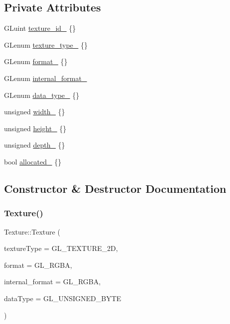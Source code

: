 \subsection*{Private Attributes}
\begin{DoxyCompactItemize}
\item 
G\+Luint \hyperlink{classpixel_1_1graphics_1_1_texture_a7100104832df040d48a8c58faae3e6b6}{texture\+\_\+id\+\_\+} \{\}
\item 
G\+Lenum \hyperlink{classpixel_1_1graphics_1_1_texture_ae1b0bc738c143b0240832129f18d4844}{texture\+\_\+type\+\_\+} \{\}
\item 
G\+Lenum \hyperlink{classpixel_1_1graphics_1_1_texture_ade4f604868a1cbd7616ae97878a0732e}{format\+\_\+} \{\}
\item 
G\+Lenum \hyperlink{classpixel_1_1graphics_1_1_texture_a7ec0a0a92db4ba2951787124f93ab2f3}{internal\+\_\+format\+\_\+}
\item 
G\+Lenum \hyperlink{classpixel_1_1graphics_1_1_texture_ad818eb8ac090e194827761713f348fbe}{data\+\_\+type\+\_\+} \{\}
\item 
unsigned \hyperlink{classpixel_1_1graphics_1_1_texture_abeadd53ba95c1d93a3c89660d9548167}{width\+\_\+} \{\}
\item 
unsigned \hyperlink{classpixel_1_1graphics_1_1_texture_a8bc8449744f4d71fa35492b2ed84fd9e}{height\+\_\+} \{\}
\item 
unsigned \hyperlink{classpixel_1_1graphics_1_1_texture_ade4b92ccd4463916dbda3256ee1cbd14}{depth\+\_\+} \{\}
\item 
bool \hyperlink{classpixel_1_1graphics_1_1_texture_a45f2bbf95259f7e05208fb44fe298829}{allocated\+\_\+} \{\}
\end{DoxyCompactItemize}


\subsection{Constructor \& Destructor Documentation}
\mbox{\label{classpixel_1_1graphics_1_1_texture_aa916d26adc7a411ca161aafd50fdf750}} 
\subsubsection{\texorpdfstring{Texture()}{Texture()}\hspace{0.1cm}{\footnotesize\ttfamily [1/3]}}
{\footnotesize\ttfamily Texture\+::\+Texture (\begin{DoxyParamCaption}\item[{G\+Lenum}]{texture\+Type = {\ttfamily GL\+\_\+TEXTURE\+\_\+2D},  }\item[{G\+Lenum}]{format = {\ttfamily GL\+\_\+RGBA},  }\item[{G\+Lenum}]{internal\+\_\+format = {\ttfamily GL\+\_\+RGBA},  }\item[{G\+Lenum}]{data\+Type = {\ttfamily GL\+\_\+UNSIGNED\+\_\+BYTE} }\end{DoxyParamCaption})\hspace{0.3cm}{\ttfamily [explicit]}}

